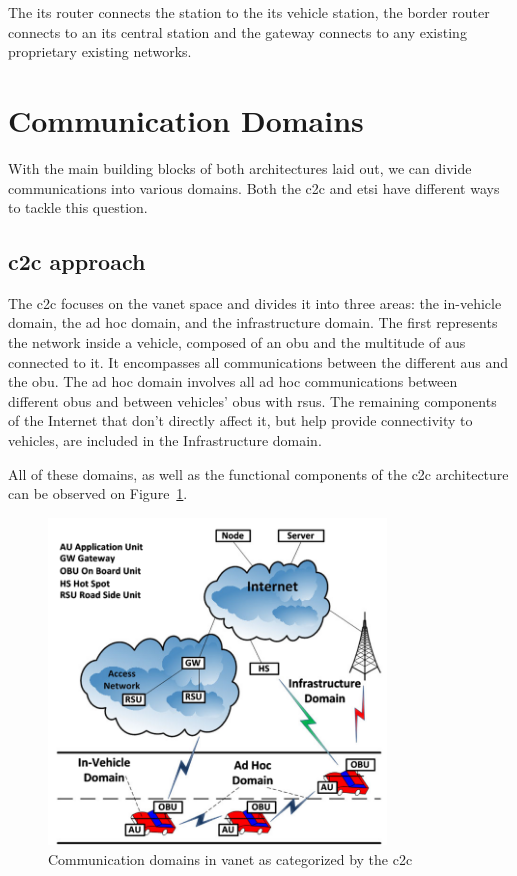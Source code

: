 \begin{enumerate}
The \gls{its} router connects the station to the \gls{its} vehicle station, the border router connects to an \gls{its} central station and the gateway connects to any existing proprietary existing networks.

\end{enumerate}


\section{Communication Domains}
\label{sec:VANET_communication_domains}

With the main building blocks of both architectures laid out, we can divide communications into various domains. Both the \gls{c2c} and \gls{etsi} have different ways to tackle this question.

\subsection[C2C approach]{\gls{c2c} approach}
The \gls{c2c} focuses on the \gls{vanet} space and divides it into three areas: the in-vehicle domain, the ad hoc domain, and the infrastructure domain.
The first represents the network inside a vehicle, composed of an \gls{obu} and the multitude of \glspl{au} connected to it. It encompasses all communications between the different \glspl{au} and the \gls{obu}.
The ad hoc domain involves all ad hoc communications between different \glspl{obu} and between vehicles' \glspl{obu} with \glspl{rsu}.
The remaining components of the Internet that don't directly affect it, but help provide connectivity to vehicles, are included in the Infrastructure domain.

All of these domains, as well as the functional components of the \gls{c2c} architecture can be observed on Figure~\ref{fig:c2c_domain}.

\begin{figure}[htbp]
	\centering
	\includegraphics[width=0.8\textwidth]{Chapters/Figures/VANETs/C2C-CC_domains.png}
	\caption{Communication domains in \gls{vanet} as categorized by the \gls{c2c}~\cite{al-sultan_comprehensive_2014}}
	\label{fig:c2c_domain}
\end{figure}

